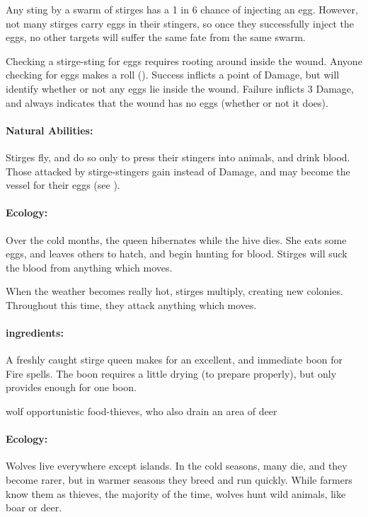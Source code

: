 \begin{multicols}{2}
\label{stirgeEggs}
Any sting by a swarm of stirges has a 1 in 6 chance of injecting an egg.
However, not many stirges carry eggs in their stingers, so once they successfully inject the eggs, no other targets will suffer the same fate from the same swarm.

Checking a stirge-sting for eggs requires rooting around inside the wound.
Anyone checking for eggs makes a  roll (\tn[12]).
Success inflicts a point of Damage, but will identify whether or not any eggs lie inside the wound.
Failure inflicts 3 Damage, and always indicates that the wound has no eggs (whether or not it does).

\paragraph{Natural Abilities:}
Stirges fly, and do so only to press their stingers into animals, and drink blood.
Those attacked by stirge-stingers gain  instead of Damage, and may become the vessel for their eggs (see ).

\paragraph{Ecology:}
Over the cold months, the queen hibernates while the hive dies.
She eats some eggs, and leaves others to hatch, and begin hunting for blood.
Stirges will suck the blood from anything which moves.

When the weather becomes really hot, stirges multiply, creating new colonies.
Throughout this time, they attack anything which moves.

\paragraph{\Glspl{ingredient}:}
A freshly caught stirge queen makes for an excellent, and immediate \gls{boon} for Fire spells.
The \gls{boon} requires a little drying (\tn[5] to prepare properly), but only provides enough for one \gls{boon}.

\stirgeSwarm

  {wolf}%
  {opportunistic food-thieves, who also drain an area of deer}%

\paragraph{Ecology:} Wolves live everywhere except islands.
In the cold seasons, many die, and they become rarer, but in warmer seasons they breed and run quickly.
While farmers know them as thieves, the majority of the time, wolves hunt wild animals, like boar or deer.


\end{multicols}
